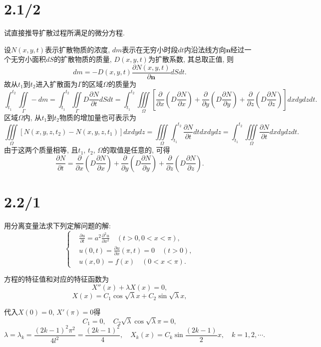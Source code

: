 \documentclass[11pt,a4paper]{article}
\begin{document}
\section{2.1/2}
\begin{problem}
试直接推导扩散过程所满足的微分方程.
\end{problem}
设$N(x,y,t)$表示扩散物质的浓度, $dm$表示在无穷小时段$dt$内沿法线方向$\mathbf{n}$经过一个无穷小面积$dS$的扩散物质的质量, $D(x,y,t)$为扩散系数, 其总取正值, 则
$$dm=-D(x,y,t)\frac{\partial N(x,y,t)}{\partial \mathbf{n}}dSdt.$$
故从$t_1$到$t_2$进入扩散面为$\Gamma$的区域$\Omega$的质量为
$$\int_{t_1}^{t_2}\iint\limits_{\Gamma}-dm=\int_{t_1}^{t_2}\iint\limits_{\Gamma}D\frac{\partial N}{\partial t}dSdt=\int_{t_1}^{t_2}\iiint\limits_{\Omega}\left[\frac{\partial}{\partial x}\left(D\frac{\partial N}{\partial x}\right)+\frac{\partial}{\partial y}\left(D\frac{\partial N}{\partial y}\right)+\frac{\partial}{\partial z}\left(D\frac{\partial N}{\partial z}\right)\right]dxdydzdt.$$
区域$\Omega$内, 从$t_1$到$t_2$物质的增加量也可表示为
$$\iiint\limits_{\Omega}\left[N(x,y,z,t_2)-N(x,y,z,t_1)\right]dxdydz=\iiint\limits_{\Omega}\int_{t_1}^{t_2}\frac{\partial N}{\partial t}dtdxdydz=\int_{t_1}^{t_2}\iiint\limits_{\Omega}\frac{\partial N}{\partial t}dxdydzdt.$$
由于这两个质量相等, 且$t_1$, $t_2$, $\Omega$的取值是任意的, 可得
$$\frac{\partial N}{\partial t}=\frac{\partial}{\partial x}\left(D\frac{\partial N}{\partial x}\right)+\frac{\partial}{\partial y}\left(D\frac{\partial N}{\partial y}\right)+\frac{\partial}{\partial z}\left(D\frac{\partial N}{\partial z}\right).$$

\section{2.2/1}
\begin{problem}
用分离变量法求下列定解问题的解:
$$\left\{\begin{aligned}
     & \frac{\partial u}{\partial t}=a^2\frac{\partial^2u}{\partial x^2}\quad (t>0,0<x<\pi), \\
     & u(0,t)=\frac{\partial u}{\partial x}(\pi,t)=0\quad (t>0),                             \\
     & u(x,0)=f(x)\quad (0<x<\pi).
  \end{aligned}\right.$$
\end{problem}

方程的特征值和对应的特征函数为
$$X''(x)+\lambda X(x)=0,$$
$$X(x)=C_1\cos\sqrt{\lambda}x+C_2\sin\sqrt{\lambda}x,$$

代入$X(0)=0$, $X'(\pi)=0$得
$$C_1=0,\quad C_2\sqrt{\lambda}\cos\sqrt{\lambda}\pi=0,$$
$$\lambda=\lambda_k=\frac{(2k-1)^2\pi^2}{4l^2}=\frac{(2k-1)^2}{4},\quad X_k(x)=C_k\sin\frac{(2k-1)}{2}x,\quad k=1,2,\cdots.$$
\end{document}
